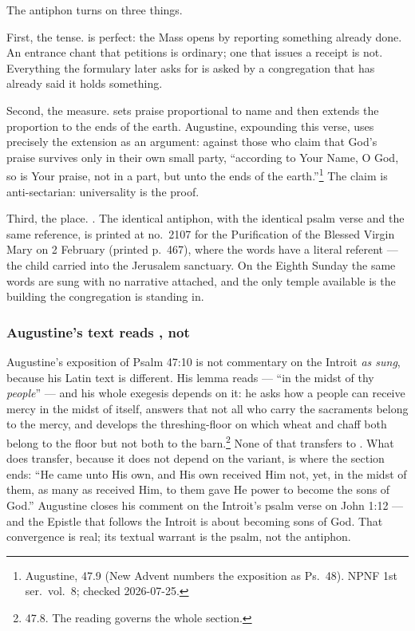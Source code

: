 The antiphon turns on three things.

First, the tense.  is perfect: the Mass opens by reporting
something already done. An entrance chant that petitions is ordinary; one that
issues a receipt is not. Everything the formulary later asks for is asked by a
congregation that has already said it holds something.

Second, the measure.  sets praise proportional to name and then extends the proportion to
the ends of the earth. Augustine, expounding this verse, uses precisely the
extension as an argument: against those who claim that God's praise survives
only in their own small party, ``according to Your Name, O God, so is Your
praise, not in a part, but unto the ends of the earth.''\footnote{Augustine,
 47.9 (New Advent numbers the exposition as Ps.\
48). NPNF 1st ser.\ vol.\ 8; checked 2026-07-25.} The claim is anti-sectarian:
universality is the proof.

Third, the place. . The identical antiphon, with the
identical psalm verse and the same reference, is printed at no.\ 2107 for the
Purification of the Blessed Virgin Mary on 2 February (printed p.\ 467), where
the words have a literal referent --- the child carried into the Jerusalem
sanctuary. On the Eighth Sunday the same words are sung with no narrative
attached, and the only temple available is the building the congregation is
standing in.

\subsubsection*{Augustine's text reads , not }

Augustine's exposition of Psalm 47:10 is not commentary on the Introit
\emph{as sung}, because his Latin text is different. His lemma reads
\latin{in medio populi tui} --- ``in the midst of thy \emph{people}'' --- and
his whole exegesis depends on it: he asks how a people can receive mercy in the
midst of itself, answers that not all who carry the sacraments belong to the
mercy, and develops the threshing-floor on which wheat and chaff both belong to
the floor but not both to the barn.\footnote{\work{Enarr.\ in Ps.} 47.8. The
reading \latin{in medio populi tui} governs the whole section.} None of that
transfers to \latin{templi}. What does transfer, because it does not depend on
the variant, is where the section ends: ``He came unto His own, and His own
received Him not, yet, in the midst of them, as many as received Him, to them
gave He power to become the sons of God.'' Augustine closes his comment on the
Introit's psalm verse on John 1:12 --- and the Epistle that follows the Introit
is about becoming sons of God. That convergence is real; its textual warrant is
the psalm, not the antiphon.

